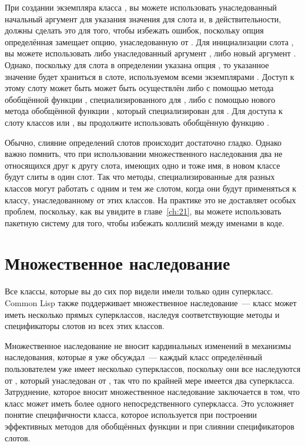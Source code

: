 При создании экземпляра класса , вы можете использовать унаследованный начальный
аргумент  для указания значения для слота  и, в действительности, должны
сделать это для того, чтобы избежать ошибок, поскольку опция  определённая
 замещает опцию, унаследованную от . Для инициализации слота ,
вы можете использовать либо унаследованный аргумент , либо новый аргумент
.  Однако, поскольку для слота  в определении  указана
опция , то указанное значение будет храниться в слоте, используемом
всеми экземплярами . Доступ к этому слоту может быть может быть осуществлён либо
с помощью метода обобщённой функции , специализированного для , либо с
помощью нового метода обобщённой функции , который специализирован для
.  Для доступа к слоту  классов  или , вы продолжите
использовать обобщённую функцию .

Обычно, слияние определений слотов происходит достаточно гладко.  Однако важно помнить,
что при использовании множественного наследования два не относящихся друг к другу слота,
имеющих одно и тоже имя, в новом классе будут слиты в один слот.  Так что методы,
специализированные для разных классов могут работать с одним и тем же слотом, когда они
будут применяться к классу, унаследованному от этих классов.  На практике это не
доставляет особых проблем, поскольку, как вы увидите в главе~\ref{ch:21}, вы можете
использовать пакетную систему для того, чтобы избежать коллизий между именами в коде.

\section{Множественное наследование}
\label{sec:17-multi-inheritance}

Все классы, которые вы до сих пор видели имели только один суперкласс. Common Lisp также
поддерживает множественное наследование~--- класс может иметь несколько прямых
суперклассов, наследуя соответствующие методы и спецификаторы слотов из всех этих классов.

Множественное наследование не вносит кардинальных изменений в механизмы наследования,
которые я уже обсуждал~--- каждый класс определённый пользователем уже имеет несколько
суперклассов, поскольку они все наследуются от , который унаследован
от , так что по крайней мере имеется два суперкласса.  Затруднение, которое вносит
множественное наследование заключается в том, что класс может иметь более одного
непосредственного суперкласса.  Это усложняет понятие специфичности класса, которое
используется при построении эффективных методов для обобщённых функции и при слиянии
спецификаторов слотов.

